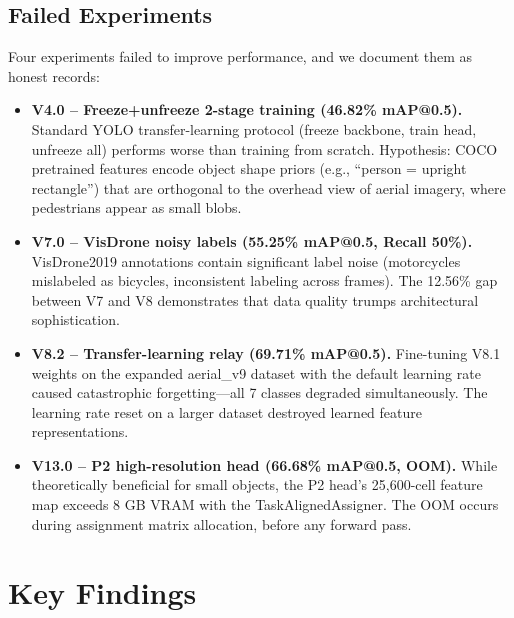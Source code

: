 \documentclass[11pt]{article}
\begin{document}
\subsection{Failed Experiments}

Four experiments failed to improve performance, and we document them as honest records:

\begin{itemize}[leftmargin=*]
    \item \textbf{V4.0 -- Freeze+unfreeze 2-stage training (46.82\% mAP@0.5).}
          Standard YOLO transfer-learning protocol (freeze backbone, train head, unfreeze all)
          performs worse than training from scratch. Hypothesis: COCO pretrained features encode
          object shape priors (e.g., ``person = upright rectangle'') that are orthogonal to the
          overhead view of aerial imagery, where pedestrians appear as small blobs.
    \item \textbf{V7.0 -- VisDrone noisy labels (55.25\% mAP@0.5, Recall 50\%).}
          VisDrone2019 annotations contain significant label noise (motorcycles mislabeled as
          bicycles, inconsistent labeling across frames). The 12.56\% gap between V7 and V8
          demonstrates that data quality trumps architectural sophistication.
    \item \textbf{V8.2 -- Transfer-learning relay (69.71\% mAP@0.5).}
          Fine-tuning V8.1 weights on the expanded aerial\_v9 dataset with the default learning
          rate caused catastrophic forgetting—all 7 classes degraded simultaneously. The learning
          rate reset on a larger dataset destroyed learned feature representations.
    \item \textbf{V13.0 -- P2 high-resolution head (66.68\% mAP@0.5, OOM).}
          While theoretically beneficial for small objects, the P2 head's 25,600-cell feature
          map exceeds 8 GB VRAM with the TaskAlignedAssigner. The OOM occurs during assignment
          matrix allocation, before any forward pass.
\end{itemize}

\section{Key Findings}
\end{document}
